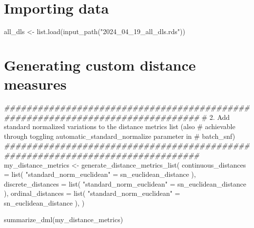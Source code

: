 \documentclass[
  letterpaper,
  DIV=11,
  numbers=noendperiod]{scrreprt}
\newenvironment{Shaded}{\begin{snugshade}}{\end{snugshade}}
\newcommand{\AttributeTok}[1]{\textcolor[rgb]{0.40,0.45,0.13}{#1}}
\newcommand{\CommentTok}[1]{\textcolor[rgb]{0.37,0.37,0.37}{#1}}
\newcommand{\DocumentationTok}[1]{\textcolor[rgb]{0.37,0.37,0.37}{\textit{#1}}}
\newcommand{\FunctionTok}[1]{\textcolor[rgb]{0.28,0.35,0.67}{#1}}
\newcommand{\NormalTok}[1]{\textcolor[rgb]{0.00,0.23,0.31}{#1}}
\newcommand{\OtherTok}[1]{\textcolor[rgb]{0.00,0.23,0.31}{#1}}
\newcommand{\StringTok}[1]{\textcolor[rgb]{0.13,0.47,0.30}{#1}}
\begin{document}
\section{Importing data}\label{importing-data}

\begin{Shaded}
\begin{Highlighting}[]
\NormalTok{all\_dls }\OtherTok{\textless{}{-}} \FunctionTok{list.load}\NormalTok{(}\FunctionTok{input\_path}\NormalTok{(}\StringTok{"2024\_04\_19\_all\_dls.rds"}\NormalTok{))}
\end{Highlighting}
\end{Shaded}

\section{Generating custom distance
measures}\label{generating-custom-distance-measures}

\begin{Shaded}
\begin{Highlighting}[]
\DocumentationTok{\#\#\#\#\#\#\#\#\#\#\#\#\#\#\#\#\#\#\#\#\#\#\#\#\#\#\#\#\#\#\#\#\#\#\#\#\#\#\#\#\#\#\#\#\#\#\#\#\#\#\#\#\#\#\#\#\#\#\#\#\#\#\#\#\#\#\#\#\#\#\#\#\#\#\#\#\#\#\#}
\CommentTok{\# 2. Add standard normalized variations to the distance metrics list (also}
\CommentTok{\# achievable through toggling automatic\_standard\_normalize parameter in}
\CommentTok{\# \textasciigrave{}batch\_snf\textasciigrave{})}
\DocumentationTok{\#\#\#\#\#\#\#\#\#\#\#\#\#\#\#\#\#\#\#\#\#\#\#\#\#\#\#\#\#\#\#\#\#\#\#\#\#\#\#\#\#\#\#\#\#\#\#\#\#\#\#\#\#\#\#\#\#\#\#\#\#\#\#\#\#\#\#\#\#\#\#\#\#\#\#\#\#\#\#}
\NormalTok{my\_distance\_metrics }\OtherTok{\textless{}{-}} \FunctionTok{generate\_distance\_metrics\_list}\NormalTok{(}
    \AttributeTok{continuous\_distances =} \FunctionTok{list}\NormalTok{(}
        \StringTok{"standard\_norm\_euclidean"} \OtherTok{=}\NormalTok{ sn\_euclidean\_distance}
\NormalTok{    ),}
    \AttributeTok{discrete\_distances =} \FunctionTok{list}\NormalTok{(}
        \StringTok{"standard\_norm\_euclidean"} \OtherTok{=}\NormalTok{ sn\_euclidean\_distance}
\NormalTok{    ),}
    \AttributeTok{ordinal\_distances =} \FunctionTok{list}\NormalTok{(}
        \StringTok{"standard\_norm\_euclidean"} \OtherTok{=}\NormalTok{ sn\_euclidean\_distance}
\NormalTok{    ),}
\NormalTok{)}

\FunctionTok{summarize\_dml}\NormalTok{(my\_distance\_metrics)}
\end{Highlighting}
\end{Shaded}
\end{document}
